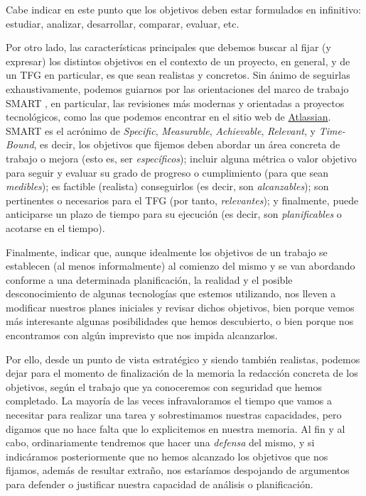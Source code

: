 Cabe indicar en este punto que los objetivos deben estar formulados en infinitivo: estudiar, analizar, desarrollar, comparar, evaluar, etc.  

Por otro lado, las características principales que debemos buscar al fijar (y expresar) los distintos objetivos en el contexto de un proyecto, en general, y de un TFG en particular, es que sean realistas y concretos. Sin ánimo de seguirlas exhaustivamente, podemos guiarnos por las orientaciones del marco de trabajo SMART \cite{doran1981there}, en particular, las revisiones más modernas y orientadas a proyectos tecnológicos, como las que podemos encontrar en el sitio web de \href{https://www.atlassian.com/blog/productivity/how-to-write-smart-goals}{Atlassian}. SMART es el acrónimo de \textit{Specific}, \textit{Measurable}, \textit{Achievable}, \textit{Relevant}, y \textit{Time-Bound}, es decir, los objetivos que fijemos deben abordar un área concreta de trabajo o mejora (esto es, ser \textit{específicos}); incluir alguna métrica o valor objetivo para seguir y evaluar su grado de progreso o cumplimiento (para que sean \textit{medibles}); es factible (realista) conseguirlos (es decir, son \textit{alcanzables}); son pertinentes o necesarios para el TFG (por tanto, \textit{relevantes}); y finalmente, puede anticiparse un plazo de tiempo para su ejecución (es decir, son \textit{planificables} o acotarse en el tiempo).

Finalmente, indicar que, aunque idealmente los objetivos de un trabajo se establecen (al menos informalmente) al comienzo del mismo y se van abordando conforme a una determinada planificación, la realidad y el posible desconocimiento de algunas tecnologías que estemos utilizando, nos lleven a modificar nuestros planes iniciales y revisar dichos objetivos, bien porque vemos más interesante algunas posibilidades que hemos descubierto, o bien porque nos encontramos con algún imprevisto que nos impida alcanzarlos.

Por ello, desde un punto de vista estratégico y siendo también realistas, podemos dejar para el momento de finalización de la memoria la redacción concreta de los objetivos, según el trabajo que ya conoceremos con seguridad que hemos completado. La mayoría de las veces infravaloramos el tiempo que vamos a necesitar para realizar una tarea y sobrestimamos nuestras capacidades, pero digamos que no hace falta que lo explicitemos en nuestra memoria. Al fin y al cabo, ordinariamente tendremos que hacer una \textit{defensa} del mismo, y si indicáramos posteriormente que no hemos alcanzado los objetivos que nos fijamos, además de resultar extraño, nos estaríamos despojando de argumentos para defender o justificar nuestra capacidad de análisis o planificación.  

